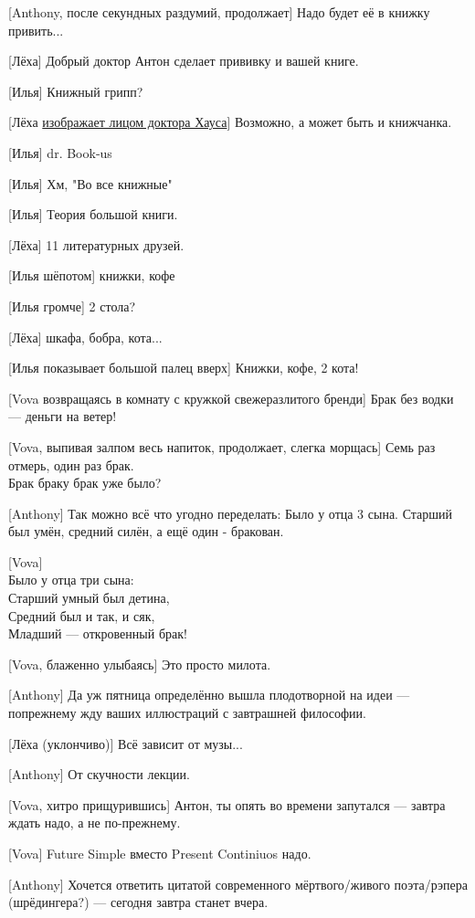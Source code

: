 [Anthony, после секундных раздумий, продолжает]
Надо будет её в книжку привить...


[Лёха]
Добрый доктор Антон сделает прививку и вашей книге.


[Илья]
Книжный грипп?


[Лёха \href{http://i5.imageban.ru/out/2014/09/04/442aff271469c9b3f514584819fcc35c.jpg}{изображает лицом доктора Хауса}]
Возможно, а может быть и книжчанка.


[Илья]
dr. Book-us


[Илья]
Хм, "Во все книжные"


[Илья]
Теория большой книги.


[Лёха]
11 литературных друзей.


[Илья шёпотом]
книжки, кофе


[Илья громче]
2 стола?


[Лёха]
шкафа, бобра, кота...


[Илья показывает большой палец вверх]
Книжки, кофе, 2 кота!


[Vova возвращаясь в комнату с кружкой свежеразлитого бренди]
Брак без водки — деньги на ветер!


[Vova, выпивая залпом весь напиток, продолжает, слегка морщась]
Семь раз отмерь, один раз брак.\\
Брак браку брак уже было?


[Anthony]
Так можно всё что угодно переделать: Было у отца 3 сына. Старший был умён, средний силён, а ещё один - бракован.


[Vova]\\
Было у отца три сына:\\
Старший умный был детина,\\
Средний был и так, и сяк,\\
Младший — откровенный брак!


[Vova, блаженно улыбаясь]
Это просто милота.


[Anthony]
Да уж пятница определённо вышла плодотворной на идеи --- попрежнему жду ваших иллюстраций с завтрашней философии.


[Лёха (уклончиво)]
Всё зависит от музы...


[Anthony]
От скучности лекции.


[Vova, хитро прищурившись]
Антон, ты опять во времени запутался — завтра ждать надо, а не по-прежнему.


[Vova]
Future Simple вместо Present Continiuos надо.


[Anthony]
Хочется ответить цитатой современного мёртвого/живого поэта/рэпера (шрёдингера?) --- сегодня завтра станет вчера.


